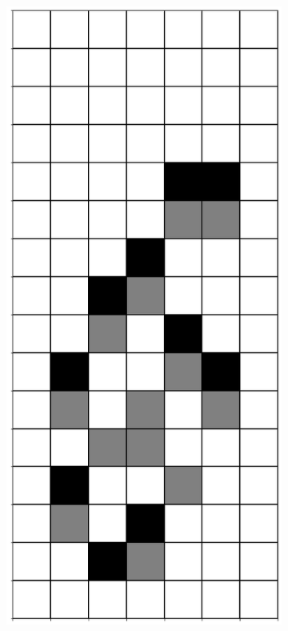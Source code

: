 \documentclass[12pt]{article}
\numberwithin{figure}{section} %
\begin{document}
\begin{figure}[H]
\begin{subfigure}{0.19\textwidth}
     \subcaption{}
   \end{subfigure}
     \begin{subfigure}{0.19\textwidth}
     \centering
     \includegraphics[width=\linewidth]{Section4/19.1}

\end{subfigure}
\end{figure}
\end{document}
